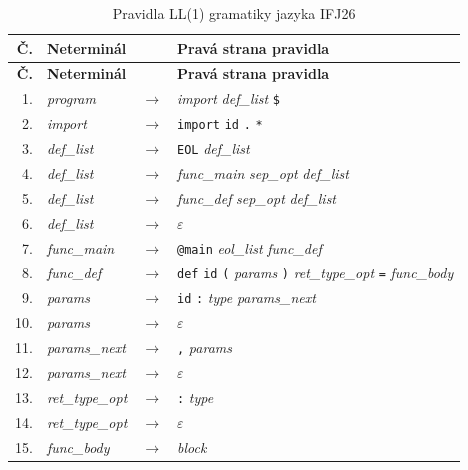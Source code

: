 \documentclass[]{ifjclass}
\begin{document}
\begin{longtable}{r l c l}
\caption{Pravidla LL(1) gramatiky jazyka IFJ26} \label{tab:ll-grammar} \\
\toprule
\textbf{Č.} & \textbf{Neterminál} & & \textbf{Pravá strana pravidla} \\
\midrule
\endfirsthead

\toprule
\textbf{Č.} & \textbf{Neterminál} & & \textbf{Pravá strana pravidla} \\
\midrule
\endhead

\midrule

\endfoot

\bottomrule
\endlastfoot

1.  & \textit{program}       & $\rightarrow$ & \textit{import} \textit{def\_list} \texttt{\$} \\
2.  & \textit{import}        & $\rightarrow$ & \texttt{import} \texttt{id} \texttt{.} \texttt{*} \\
3.  & \textit{def\_list}     & $\rightarrow$ & \texttt{EOL} \textit{def\_list} \\
4.  & \textit{def\_list}     & $\rightarrow$ & \textit{func\_main} \textit{sep\_opt} \textit{def\_list} \\
5.  & \textit{def\_list}     & $\rightarrow$ & \textit{func\_def} \textit{sep\_opt} \textit{def\_list} \\
6.  & \textit{def\_list}     & $\rightarrow$ & $\varepsilon$ \\
7.  & \textit{func\_main}    & $\rightarrow$ & \texttt{@main} \textit{eol\_list} \textit{func\_def} \\
8.  & \textit{func\_def}     & $\rightarrow$ & \texttt{def} \texttt{id} \texttt{(} \textit{params} \texttt{)} \textit{ret\_type\_opt} \texttt{=} \textit{func\_body} \\
9.  & \textit{params}        & $\rightarrow$ & \texttt{id} \texttt{:} \textit{type} \textit{params\_next} \\
10. & \textit{params}        & $\rightarrow$ & $\varepsilon$ \\
11. & \textit{params\_next}  & $\rightarrow$ & \texttt{,} \textit{params} \\
12. & \textit{params\_next}  & $\rightarrow$ & $\varepsilon$ \\
13. & \textit{ret\_type\_opt}& $\rightarrow$ & \texttt{:} \textit{type} \\
14. & \textit{ret\_type\_opt}& $\rightarrow$ & $\varepsilon$ \\
15. & \textit{func\_body}    & $\rightarrow$ & \textit{block} \\

\end{longtable}
\end{document}
